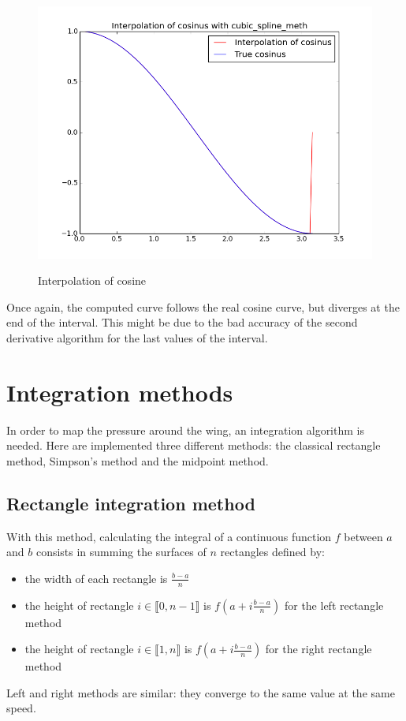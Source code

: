 \documentclass{article}
\begin{document}
\begin{figure}[h]
  \centering
  \caption{Interpolation of cosine}
  \includegraphics[width=12cm]{cosinus_interpolation}
  \label{cosinus_interpolation}
\end{figure}

Once again, the computed curve follows the real cosine curve, but diverges at the end of the interval. This might be due to the bad accuracy of the second derivative algorithm for the last values of the interval.

\section{Integration methods}
In order to map the pressure around the wing, an integration algorithm is needed. Here are implemented three different methods: the classical rectangle method, Simpson's method and the midpoint method.

\subsection{Rectangle integration method}
With this method, calculating the integral of a continuous function $f$ between $a$ and $b$ consists in summing the surfaces of $n$ rectangles defined by:
\begin{itemize}
\item the width of each rectangle is $\frac{b - a}{n}$
\item the height of rectangle $i \in \llbracket 0, n - 1 \rrbracket$ is $f(a + i\frac{b - a}{n})$ for the left rectangle method
\item the height of rectangle $i \in \llbracket 1, n \rrbracket$ is $f(a + i\frac{b - a}{n})$ for the right rectangle method
\end{itemize}
Left and right methods are similar: they converge to the same value at the same speed.
\end{document}
